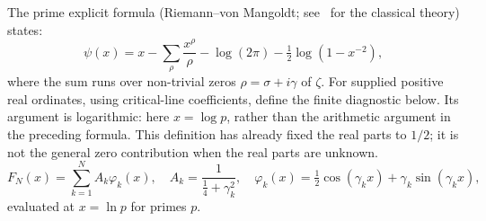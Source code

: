 \documentclass[11pt,a4paper]{article}
\theoremstyle{plain}
\theoremstyle{definition}
\theoremstyle{remark}
\begin{document}
The prime explicit formula (Riemann--von Mangoldt; see~\cite{Davenport2000} for the classical theory) states:
\begin{equation}
  \psi(x) = x - \sum_\rho \frac{x^\rho}{\rho} - \log(2\pi) - \tfrac{1}{2}\log(1-x^{-2}),
\end{equation}
where the sum runs over non-trivial zeros $\rho = \sigma + i\gamma$ of $\zeta$.
For supplied positive real ordinates, using critical-line coefficients,
define the finite diagnostic below. Its argument is logarithmic: here
$x=\log p$, rather than the arithmetic argument in the preceding formula.
This definition has already fixed the real parts to $1/2$; it is not the
general zero contribution when the real parts are unknown.
\begin{equation}
  F_N(x) = \sum_{k=1}^N A_k \varphi_k(x), 
  \quad A_k = \frac{1}{\tfrac{1}{4}+\gamma_k^2}, 
  \quad \varphi_k(x) = \tfrac{1}{2}\cos(\gamma_k x) + \gamma_k\sin(\gamma_k x),
\end{equation}
evaluated at $x = \ln p$ for primes $p$.
\end{document}
